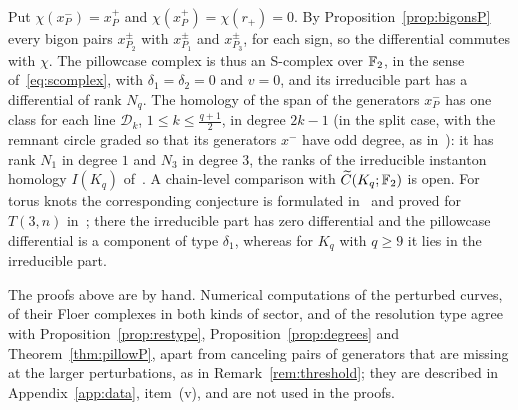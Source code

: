 \begin{remark}\label{rem:scomplexP}
Put $\chi(x_P^-)=x_P^+$ and $\chi(x_P^+)=\chi(r_+)=0$. By Proposition~\ref{prop:bigonsP} every bigon pairs $x^\pm_{P_2}$ with
$x^\pm_{P_1}$ and $x^\pm_{P_3}$, for each sign, so the differential commutes with $\chi$. The pillowcase complex is thus an
S-complex over $\mathbb{F}_2$, in the sense of~\eqref{eq:scomplex}, with $\delta_1=\delta_2=0$ and $v=0$, and its irreducible part has a
differential of rank $N_q$. The homology of the span of the generators $x_P^-$ has one class for each line $\mathcal D_k$, $1\le k\le\frac{q+1}2$, in
degree $2k-1$ (in the split case, with the remnant circle graded so that its generators $x^-$ have odd degree, as
in~\cite[Def.~6.13]{WuebbenV}): it has rank $N_1$ in degree $1$ and $N_3$ in degree $3$, the ranks of the irreducible instanton homology $I(K_q)$
of~\cite[Prop.~8.30]{DS24}. A chain-level comparison with $\widetilde C(K_q;\mathbb{F}_2)$ is open. For torus knots the
corresponding conjecture is formulated in~\cite[Conj.~1.5]{WuebbenIV} and proved for $T(3,n)$
in~\cite[Thm.~1.3]{WuebbenV}; there the irreducible part has zero differential and the pillowcase differential is a
component of type $\delta_1$, whereas for $K_q$ with $q\ge9$ it lies in the irreducible part.
\end{remark}

\begin{remark}\label{rem:numericsP}
The proofs above are by hand. Numerical computations of the perturbed curves, of their Floer complexes in both kinds
of sector, and of the resolution type agree with Proposition~\ref{prop:restype}, Proposition~\ref{prop:degrees} and
Theorem~\ref{thm:pillowP}, apart from canceling pairs of generators that are missing at the larger perturbations, as in
Remark~\ref{rem:threshold}; they are described in Appendix~\ref{app:data}, item~(v), and are not used in the proofs.
\end{remark}
